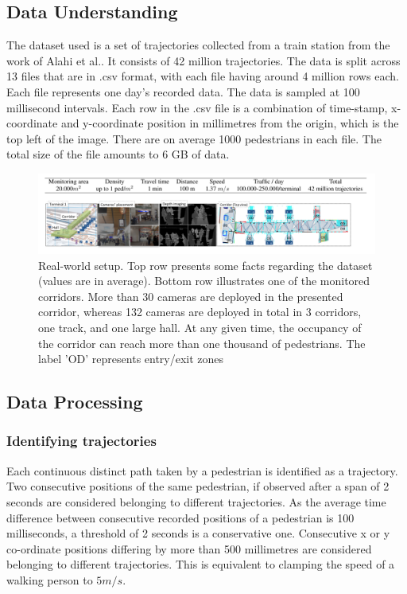 \subsection{Data Understanding}

The dataset used is a set of trajectories collected from a train station from the work of Alahi et al.\cite{alahi_socially-aware_2014}. It consists of 42 million trajectories. 
The data is split across 13 files that are in .csv format, with each file having around 4 million rows each. Each file represents one day's recorded data. The data is sampled at 100 millisecond intervals. Each row in the .csv file is a combination of time-stamp, x-coordinate and y-coordinate position in millimetres from the origin, which is the top left of the image. There are on average 1000 pedestrians in each file. The total size of the file amounts to 6 GB of data.
\begin{figure}[h]
    \centering
    \includegraphics[width=\textwidth]{Figures/Dataset_explanation.png}
    \caption[Key info of Dataset used]{Real-world setup. Top row presents some facts regarding the dataset (values are in average). Bottom row illustrates one of the monitored corridors. More than 30 cameras are deployed in the presented corridor, whereas 132 cameras are deployed in total in 3 corridors, one track, and one large hall. At any given time, the occupancy of the corridor can reach more than one thousand of pedestrians. The label 'OD' represents entry/exit zones \cite{alahi_socially-aware_2014}}

    \label{fig:dataset_explanation}
\end{figure}






\subsection{Data Processing}
\subsubsection{Identifying trajectories}

Each continuous distinct path taken by a pedestrian is identified as a trajectory. Two consecutive positions of the same pedestrian, if observed after a span of 2 seconds are considered belonging to different trajectories.
As the average time difference between consecutive recorded positions of a pedestrian is 100 milliseconds, a threshold of 2 seconds is a conservative one.
Consecutive x or y co-ordinate positions differing by more than 500 millimetres are considered belonging to different trajectories. This is equivalent to clamping the speed of a walking person to \(5 m/s\).
    
